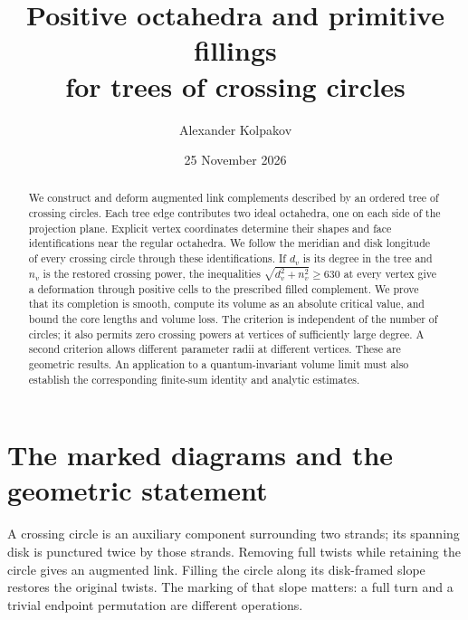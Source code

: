 \documentclass[11pt]{article}
\title{Positive octahedra and primitive fillings\protect\\for trees of crossing circles}
\author{Alexander Kolpakov}
\date{25 November 2026}
\numberwithin{equation}{section}
\theoremstyle{definition}
\theoremstyle{remark}
\begin{document}
\maketitle

\begin{abstract}
We construct and deform augmented link complements described by an
ordered tree of crossing circles. Each tree edge contributes two ideal
octahedra, one on each side of the projection plane. Explicit vertex
coordinates determine their shapes and face identifications near the
regular octahedra. We follow the meridian and disk longitude of every
crossing circle through these identifications. If $d_v$ is its degree
in the tree and $n_v$ is the restored crossing power, the inequalities
$\sqrt{d_v^2+n_v^2}\ge630$ at every vertex give a deformation through
positive cells to the prescribed filled complement. We prove that its
completion is smooth, compute its volume as an absolute critical value,
and bound the core lengths and volume loss. The criterion is independent
of the number of circles; it also permits zero crossing powers at
vertices of sufficiently large degree. A second criterion allows
different parameter radii at different vertices. These are geometric
results. An application to a quantum-invariant volume limit must also
establish the corresponding finite-sum identity and analytic estimates.
\end{abstract}

\section{The marked diagrams and the geometric statement}
\label{ctg:introduction}

A crossing circle is an auxiliary component surrounding two strands;
its spanning disk is punctured twice by those strands. Removing full
twists while retaining the circle gives an augmented link. Filling the
circle along its disk-framed slope restores the original twists.
The marking of that slope matters: a full turn and a trivial endpoint
permutation are different operations.
\end{document}

